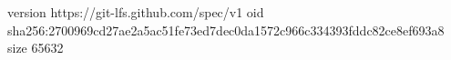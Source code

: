 version https://git-lfs.github.com/spec/v1
oid sha256:2700969cd27ae2a5ac51fe73ed7dec0da1572c966c334393fddc82ce8ef693a8
size 65632
